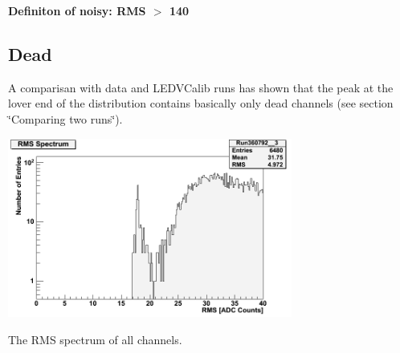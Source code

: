 {\bfseries Definiton of noisy\-: R\-M\-S $>$ 140 }\hypertarget{index_Dead}{}\subsection{Dead}\label{index_Dead}
A comparisan with data and L\-E\-D\-V\-Calib runs has shown that the peak at the lover end of the distribution contains basically only dead channels (see section \char`\"{}\-Comparing two runs\char`\"{}).

 
\begin{DoxyImage}
\includegraphics[width=0.7\textwidth]{rms_spectrum_zoom.png}
\caption{The R\-M\-S spectrum of all channels.}
\end{DoxyImage}


